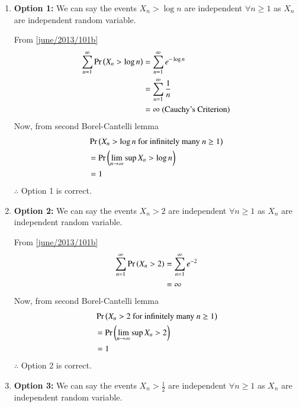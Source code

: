 \bigskip
\begin{enumerate}
    \item \textbf{Option 1:} 
    We can say the events $X_n>\log n$ are independent $\forall n\geq 1$ as $X_n$ are independent random variable.
    
    From \eqref{june/2013/101b}
    \begin{align}
        \sum_{n=1}^{\infty}\Pr\left(X_n > \log n\right) &=\sum_{n=1}^{\infty}e^{-\log n}\nonumber\\ &=\sum_{n=1}^{\infty}\frac{1}{n}\nonumber\\
                                            &= \infty  \text{ (Cauchy's Criterion)}\nonumber
    \end{align}
    Now, from second Borel-Cantelli lemma
    \begin{align}
        &\Pr\left(X_n>\log n \text{ for infinitely many }n\geq1\right)\nonumber\\
        &=\Pr\left(\lim_{n \rightarrow \infty}\sup X_n>\log n\right)\nonumber\\
        &=1\nonumber
    \end{align}
    $\therefore$ Option 1 is correct. 
    
    \item\textbf{Option 2:} We can say the events $X_n>2$ are independent $\forall n\geq 1$ as $X_n$ are independent random variable.
    
    From \eqref{june/2013/101b}
    \begin{align}
        \sum_{n=1}^{\infty}\Pr\left(X_n > 2\right) &= \sum_{n=1}^{\infty}e^{-2}\nonumber\\
                                            &= \infty\nonumber
    \end{align}
    Now, from second Borel-Cantelli lemma
    \begin{align}
        &\Pr\left(X_n>2 \text{ for infinitely many }n\geq1\right)\nonumber\\
        &=\Pr\left(\lim_{n \rightarrow \infty}\sup X_n>2\right)\nonumber\\
        &=1\nonumber
    \end{align}
    $\therefore$ Option 2 is correct.
    
    \item \textbf{Option 3:} We can say the events $X_n>\frac{1}{2}$ are independent $\forall n\geq 1$ as $X_n$ are independent random variable.
    

\end{enumerate}
